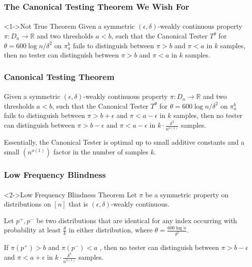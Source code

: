 \documentclass{beamer}
\begin{document}
\begin{frame}
  \frametitle{The Canonical Testing Theorem We Wish For}
  \framesubtitle{}
  \begin{block}<1->{Not True Theorem}
    Given a symmetric $(\epsilon,\delta)$-weakly continuous property
    $\pi:D_n\rightarrow \mathbb{R}$ and two thresholds $a<b$, such
    that the Canonical Tester $T^\theta$ for $\theta=600\log
    n/\delta^2$ on $\pi_a^b$ fails to distinguish between $\pi>b$ and
    $\pi<a$ in $k$ samples, then no tester can distinguish between
    $\pi>b$ and $\pi<a$ in $k$ samples.
  \end{block}
\end{frame}
\begin{frame}
  \frametitle{Canonical Testing Theorem}
  \framesubtitle{}
  \begin{theorem}
    Given a symmetric $(\epsilon,\delta)$-weakly continuous property
    $\pi:D_n\rightarrow \mathbb{R}$ and two thresholds $a<b$, such
    that the Canonical Tester $T^\theta$ for $\theta=600\log
    n/\delta^2$ on $\pi_a^b$ fails to distinguish between
    $\pi>b+\epsilon$ and $\pi<a-\epsilon$ in $k$ samples, then no
    tester can distinguish between $\pi>b-\epsilon$ and
    $\pi<a-\epsilon$ in $k\cdot \frac{\delta^3}{n^{o(1)}}$ samples.
  \end{theorem}
  Essentially, the Canonical Tester is optimal up to small additive
  constants and a small $(n^{o(1)})$ factor in the number of samples
  $k$.
\end{frame}


\begin{frame}
  \frametitle{Low Frequency Blindness} \framesubtitle{}

  
  \begin{block}<2->{Low Frequency Blindness Theorem}
    Let $\pi$ be a symmetric property on distributions on $[n]$ that
    is $(\epsilon,\delta)$-weakly continuous.

    Let $p^+,p^-$ be two distributions that are identical for any
    index occurring with probability at least $\frac{\theta}{k}$ in
    either distribution, where $\theta=\frac{600\log n}{\delta^2}$.

    If $\pi(p^+)>b$ and $\pi(p^-)<a$ , then no tester can distinguish
    between $\pi>b-\epsilon$ and $\pi<a+\epsilon$ in $k\cdot
    \frac{\delta^3}{n^{o(1)}}$ samples.
  \end{block}

  
\end{frame}
\end{document}
